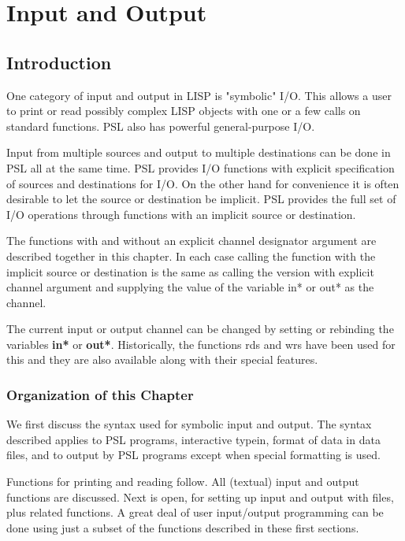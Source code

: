 \chapter*{Input and Output}

\section{Introduction}

One category of input and output in LISP is "symbolic" I/O.
This allows a user to print or read possibly complex LISP
objects with one or a few calls on standard functions. PSL also
has powerful general-purpose I/O.

Input from multiple sources and output to multiple destinations
can be done in PSL all  at  the  same  time.  PSL
provides  I/O  functions  with explicit specification of sources
and destinations for I/O.  On the other hand for convenience  it
is often desirable to let the source or destination be implicit.
PSL  provides  the  full set of I/O operations through functions
with an implicit source or destination.

  The functions with and without an explicit channel  designator
argument  are  described together in this chapter.  In each case
calling the function with the implicit source or destination  is
the  same  as calling the version with explicit channel argument
and supplying the value of the  variable  in*  or  out*  as  the
channel.

  The  current input or output channel can be changed by setting
or rebinding the variables {\bf in*}  or {\bf out*}.  
  Historically,  the
functions  rds and wrs have been used for this and they are also
available along with their special features.

\subsection{Organization of this Chapter}

  We first discuss  the  syntax  used  for  symbolic  input  and
output.    The   syntax   described  applies  to  PSL  programs,
interactive typein, format of data in data files, and to  output
by PSL programs except when special formatting is used.

  Functions  for  printing  and  reading  follow.  All (textual)
input and output functions are discussed.   Next  is  open,  for
setting  up input and output with files, plus related functions.
A great deal of user input/output programming can be done  using
just  a  subset  of  the  functions  described  in  these  first
sections.

